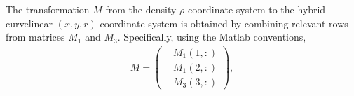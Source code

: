 \documentclass[12pt]{report}
\begin{document}
The transformation $M$ from the density $\rho$ coordinate system to the
hybrid curvelinear $(x,y,r)$ coordinate system is obtained by
combining relevant rows from matrices $M_1$ and $M_3$. Specifically,
using the Matlab conventions,
\begin{align}
  \label{eq:34}
  M = \left(
    \begin{aligned}
     &M_1(1,:)\\
     &M_1(2,:)\\
     &M_3(3,:)
    \end{aligned}\right),
\end{align}
\end{document}
